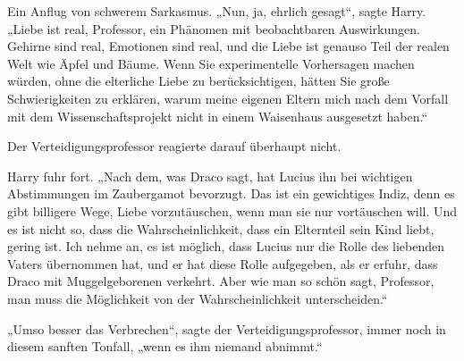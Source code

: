 Ein Anflug von schwerem Sarkasmus. „Nun, ja, ehrlich gesagt“, sagte Harry. „Liebe ist real, Professor, ein Phänomen mit beobachtbaren Auswirkungen. Gehirne sind real, Emotionen sind real, und die Liebe ist genauso Teil der realen Welt wie Äpfel und Bäume. Wenn Sie experimentelle Vorhersagen machen würden, ohne die elterliche Liebe zu berücksichtigen, hätten Sie große Schwierigkeiten zu erklären, warum meine eigenen Eltern mich nach dem Vorfall mit dem Wissenschaftsprojekt nicht in einem Waisenhaus ausgesetzt haben.“

Der Verteidigungsprofessor reagierte darauf überhaupt nicht.

Harry fuhr fort. „Nach dem, was Draco sagt, hat Lucius ihn bei wichtigen Abstimmungen im Zaubergamot bevorzugt. Das ist ein gewichtiges Indiz, denn es gibt billigere Wege, Liebe vorzutäuschen, wenn man sie nur vortäuschen will. Und es ist nicht so, dass die Wahrscheinlichkeit, dass ein Elternteil sein Kind liebt, gering ist. Ich nehme an, es ist möglich, dass Lucius nur die Rolle des liebenden Vaters übernommen hat, und er hat diese Rolle aufgegeben, als er erfuhr, dass Draco mit Muggelgeborenen verkehrt. Aber wie man so schön sagt, Professor, man muss die Möglichkeit von der Wahrscheinlichkeit unterscheiden.“

„Umso besser das Verbrechen“, sagte der Verteidigungsprofessor, immer noch in diesem sanften Tonfall, „wenn es ihm niemand abnimmt.“

